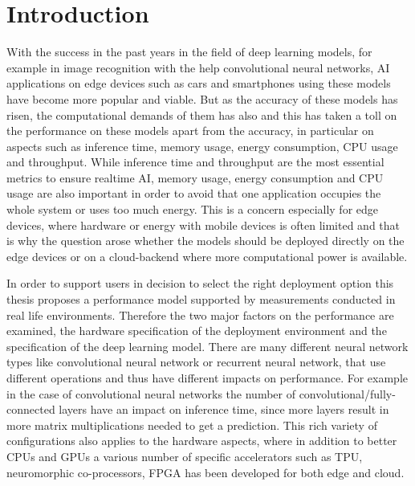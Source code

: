\chapter{Introduction}




With the success in the past years in the field of deep learning models, for example in image recognition with the help convolutional neural networks, AI applications on edge devices such as cars and smartphones using these models have become more popular and viable.
But as the accuracy of these models has risen, the computational demands of them has also and this has taken a toll on the performance on these models apart from the accuracy, in particular on aspects such as inference time, memory usage, energy consumption, CPU usage and throughput. 
While inference time and throughput are the most essential metrics to ensure realtime AI, memory usage, energy consumption and CPU usage are also important in order to avoid that one application occupies the whole system or uses too much energy.
This is a concern especially for edge devices, where hardware or energy with mobile devices is often limited and that is why the question arose whether the models should be deployed directly on the edge devices or on a cloud-backend where more computational power is available. 

In order to support users in decision to select the right deployment option this thesis proposes a performance model supported by measurements conducted in real life environments.
Therefore the two major factors on the performance are examined, the hardware specification of the deployment environment and the specification of the deep learning model. 
There are many different neural network types like convolutional neural network or recurrent neural network, that use different operations and thus have different impacts on performance.
For example in the case of convolutional neural networks the number of convolutional/fully-connected layers have an impact on inference time, since more layers result in more matrix multiplications needed to get a prediction.
This rich variety of configurations also applies to the hardware aspects, where in addition to better CPUs and GPUs a various number of specific accelerators such as TPU, neuromorphic co-processors, FPGA has been developed for both edge and cloud.




